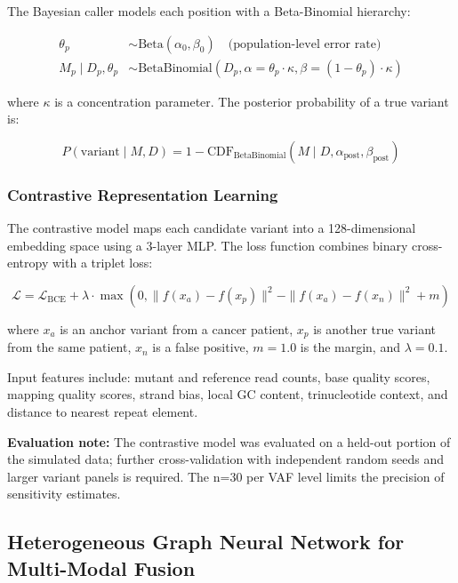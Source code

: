 \documentclass[10pt,a4paper]{article}
\begin{document}
The Bayesian caller models each position with a Beta-Binomial hierarchy:

\begin{align}
\theta_p &\sim \text{Beta}(\alpha_0, \beta_0) \quad \text{(population-level error rate)} \\
M_p \mid D_p, \theta_p &\sim \text{BetaBinomial}(D_p, \alpha = \theta_p \cdot \kappa, \beta = (1-\theta_p) \cdot \kappa)
\end{align}

where $\kappa$ is a concentration parameter. The posterior probability of a true variant is:

\begin{equation}
P(\text{variant} \mid M, D) = 1 - \text{CDF}_{\text{BetaBinomial}}(M \mid D, \alpha_{\text{post}}, \beta_{\text{post}})
\end{equation}

\subsubsection{Contrastive Representation Learning}

The contrastive model maps each candidate variant into a 128-dimensional embedding space using a 3-layer MLP. The loss function combines binary cross-entropy with a triplet loss:

\begin{equation}
\mathcal{L} = \mathcal{L}_{\text{BCE}} + \lambda \cdot \max(0, \|f(x_a) - f(x_p)\|^2 - \|f(x_a) - f(x_n)\|^2 + m)
\end{equation}

where $x_a$ is an anchor variant from a cancer patient, $x_p$ is another true variant from the same patient, $x_n$ is a false positive, $m = 1.0$ is the margin, and $\lambda = 0.1$.

Input features include: mutant and reference read counts, base quality scores, mapping quality scores, strand bias, local GC content, trinucleotide context, and distance to nearest repeat element.

\textbf{Evaluation note:} The contrastive model was evaluated on a held-out portion of the simulated data; further cross-validation with independent random seeds and larger variant panels is required. The n=30 per VAF level limits the precision of sensitivity estimates.

\subsection{Heterogeneous Graph Neural Network for Multi-Modal Fusion}
\end{document}
